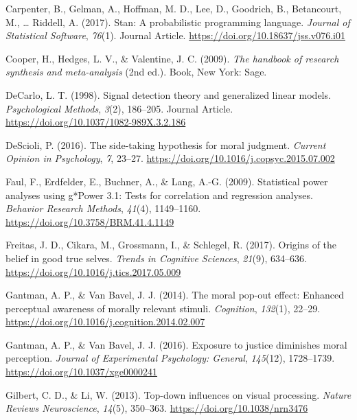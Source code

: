 \documentclass[
  english,
  man]{apa6}
\begin{document}
\leavevmode\hypertarget{ref-Carpenter_2017_stan}{}%
Carpenter, B., Gelman, A., Hoffman, M. D., Lee, D., Goodrich, B., Betancourt, M., \ldots{} Riddell, A. (2017). Stan: A probabilistic programming language. \emph{Journal of Statistical Software}, \emph{76}(1). Journal Article. \url{https://doi.org/10.18637/jss.v076.i01}

\leavevmode\hypertarget{ref-Cooper_2009_handbook}{}%
Cooper, H., Hedges, L. V., \& Valentine, J. C. (2009). \emph{The handbook of research synthesis and meta-analysis} (2nd ed.). Book, New York: Sage.

\leavevmode\hypertarget{ref-DeCarlo_1998}{}%
DeCarlo, L. T. (1998). Signal detection theory and generalized linear models. \emph{Psychological Methods}, \emph{3}(2), 186--205. Journal Article. \url{https://doi.org/10.1037/1082-989X.3.2.186}

\leavevmode\hypertarget{ref-descioli_side-taking_2016}{}%
DeScioli, P. (2016). The side-taking hypothesis for moral judgment. \emph{Current Opinion in Psychology}, \emph{7}, 23--27. \url{https://doi.org/10.1016/j.copsyc.2015.07.002}

\leavevmode\hypertarget{ref-faul_statistical_2009}{}%
Faul, F., Erdfelder, E., Buchner, A., \& Lang, A.-G. (2009). Statistical power analyses using g*Power 3.1: Tests for correlation and regression analyses. \emph{Behavior Research Methods}, \emph{41}(4), 1149--1160. \url{https://doi.org/10.3758/BRM.41.4.1149}

\leavevmode\hypertarget{ref-freitas_origins_2017}{}%
Freitas, J. D., Cikara, M., Grossmann, I., \& Schlegel, R. (2017). Origins of the belief in good true selves. \emph{Trends in Cognitive Sciences}, \emph{21}(9), 634--636. \url{https://doi.org/10.1016/j.tics.2017.05.009}

\leavevmode\hypertarget{ref-gantman_moral_2014}{}%
Gantman, A. P., \& Van Bavel, J. J. (2014). The moral pop-out effect: Enhanced perceptual awareness of morally relevant stimuli. \emph{Cognition}, \emph{132}(1), 22--29. \url{https://doi.org/10.1016/j.cognition.2014.02.007}

\leavevmode\hypertarget{ref-gantman_exposure_2016}{}%
Gantman, A. P., \& Van Bavel, J. J. (2016). Exposure to justice diminishes moral perception. \emph{Journal of Experimental Psychology: General}, \emph{145}(12), 1728--1739. \url{https://doi.org/10.1037/xge0000241}

\leavevmode\hypertarget{ref-gilbert_top-down_2013}{}%
Gilbert, C. D., \& Li, W. (2013). Top-down influences on visual processing. \emph{Nature Reviews Neuroscience}, \emph{14}(5), 350--363. \url{https://doi.org/10.1038/nrn3476}
\end{document}
